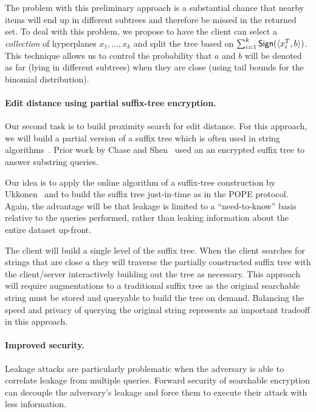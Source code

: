 The problem with this preliminary approach is a substantial chance that
nearby items will end up in different subtrees and therefore be
missed in the returned set.
To deal with this
problem, we propose to have the client can select a \emph{collection}
of hyperplanes $x_1,..., x_k$ and
split the tree based on $\sum_{i=1}^k \mathsf{Sign}( \langle x_i^T, b \rangle )$.  This
technique allows us to control the probability that $a$ and $b$ will be denoted
as far (lying in different subtrees) when they are close (using tail bounds for
the binomial distribution). %

\paragraph{Edit distance using partial suffix-tree encryption.}
Our second task is to build proximity search for edit distance.  For this
approach, we will build a partial version of a suffix tree which is often used
in string algorithms~\cite{mccreight1976space}.  Prior work by Chase and
Shen~\cite{chase2015substring} used an an encrypted suffix tree to answer
substring queries.

Our idea is to apply the online algorithm of a suffix-tree construction by
Ukkonen~\cite{Ukkonen95} and to build the suffix tree just-in-time as in
the POPE protocol. Again, the advantage will be that leakage is limited
to a ``need-to-know'' basis relative to the queries performed, rather
than leaking information about the entire dataset up-front.

The client will build a single level of the
suffix tree.  When the client searches for strings that are close $a$ they will
traverse the partially constructed suffix tree with the client/server
interactively building out the tree as necessary.  This approach will require
augmentations to a traditional suffix tree as the original searchable string
must be stored and queryable to build the tree on demand.  Balancing the speed
and privacy of querying the original string represents an important tradeoff in
this approach.

\paragraph{Improved security.} Leakage attacks are particularly problematic when
the adversary is able to correlate leakage from multiple queries.  Forward
security of searchable encryption can decouple the adversary's leakage and force
them to execute their attack with less information.  

